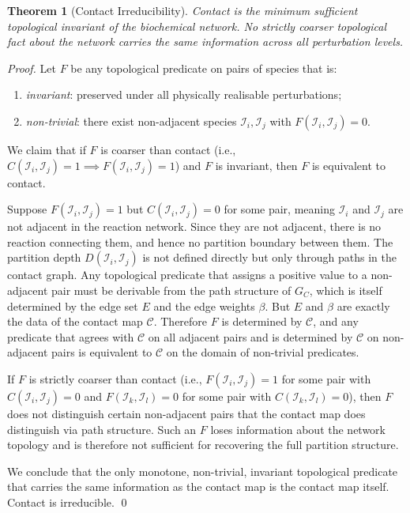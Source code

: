\documentclass[11pt,twocolumn]{article}
\theoremstyle{plain}
\newtheorem{theorem}{Theorem}[section]
\theoremstyle{definition}
\newcommand{\CC}{\mathcal{C}}
\begin{document}
\begin{theorem}[Contact Irreducibility]
\label{thm:contact_irreducibility}
Contact is the minimum sufficient topological invariant of the biochemical
network. No strictly coarser topological fact about the network carries the
same information across all perturbation levels.
\end{theorem}

\begin{proof}
Let $F$ be any topological predicate on pairs of species that is:
\begin{enumerate}[label=(\roman*)]
\item \emph{invariant}: preserved under all physically realisable perturbations;
\item \emph{non-trivial}: there exist non-adjacent species $\mathcal{I}_i,
  \mathcal{I}_j$ with $F(\mathcal{I}_i, \mathcal{I}_j) = 0$.
\end{enumerate}

We claim that if $F$ is coarser than contact (i.e., $C(\mathcal{I}_i,
\mathcal{I}_j) = 1 \implies F(\mathcal{I}_i, \mathcal{I}_j) = 1$) and
$F$ is invariant, then $F$ is equivalent to contact.

Suppose $F(\mathcal{I}_i, \mathcal{I}_j) = 1$ but $C(\mathcal{I}_i,
\mathcal{I}_j) = 0$ for some pair, meaning $\mathcal{I}_i$ and $\mathcal{I}_j$
are not adjacent in the reaction network. Since they are not adjacent, there is
no reaction connecting them, and hence no partition boundary between them. The
partition depth $D(\mathcal{I}_i, \mathcal{I}_j)$ is not defined directly but
only through paths in the contact graph. Any topological predicate that assigns
a positive value to a non-adjacent pair must be derivable from the path structure
of $G_C$, which is itself determined by the edge set $E$ and the edge weights
$\beta$. But $E$ and $\beta$ are exactly the data of the contact map $\CC$.
Therefore $F$ is determined by $\CC$, and any predicate that agrees with
$\CC$ on all adjacent pairs and is determined by $\CC$ on non-adjacent pairs
is equivalent to $\CC$ on the domain of non-trivial predicates.

If $F$ is strictly coarser than contact (i.e., $F(\mathcal{I}_i,
\mathcal{I}_j) = 1$ for some pair with $C(\mathcal{I}_i, \mathcal{I}_j) = 0$
and $F(\mathcal{I}_k, \mathcal{I}_l) = 0$ for some pair with
$C(\mathcal{I}_k, \mathcal{I}_l) = 0$), then $F$ does not distinguish certain
non-adjacent pairs that the contact map does distinguish via path structure.
Such an $F$ loses information about the network topology and is therefore not
sufficient for recovering the full partition structure.

We conclude that the only monotone, non-trivial, invariant topological predicate
that carries the same information as the contact map is the contact map itself.
Contact is irreducible. \qed
\end{proof}
\end{document}
